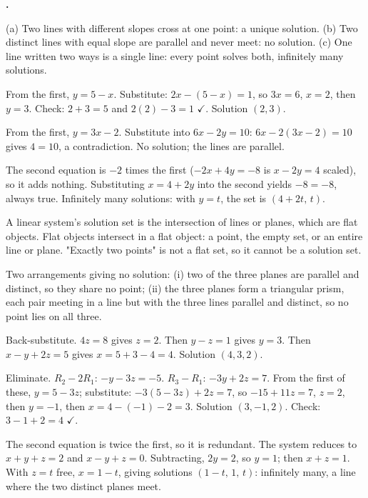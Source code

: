 \documentclass[12pt]{book}
\let\originalcheckmark\checkmark
\renewcommand{\checkmark}{\ensuremath{\originalcheckmark}}
\newcounter{soln}[section]
\newenvironment{solutions}{%
  \setcounter{soln}{0}%
  \begin{list}{\textbf{\arabic{soln}.}}{%
    \usecounter{soln}\setlength{\leftmargin}{2.2em}\setlength{\itemsep}{10pt}}%
}{\end{list}}
\begin{document}
\begin{solutions}
\item (a) Two lines with different slopes cross at one point: a unique solution. (b)
Two distinct lines with equal slope are parallel and never meet: no solution. (c) One
line written two ways is a single line: every point solves both, infinitely many
solutions.

\item From the first, $y=5-x$. Substitute: $2x-(5-x)=1$, so $3x=6$, $x=2$, then $y=3$.
Check: $2+3=5$ and $2(2)-3=1$ \checkmark. Solution $(2,3)$.

\item From the first, $y=3x-2$. Substitute into $6x-2y=10$: $6x-2(3x-2)=10$ gives
$4=10$, a contradiction. No solution; the lines are parallel.

\item The second equation is $-2$ times the first ($-2x+4y=-8$ is $x-2y=4$ scaled), so
it adds nothing. Substituting $x=4+2y$ into the second yields $-8=-8$, always true.
Infinitely many solutions: with $y=t$, the set is $(4+2t,\,t)$.

\item A linear system's solution set is the intersection of lines or planes, which are
flat objects. Flat objects intersect in a flat object: a point, the empty set, or an
entire line or plane. "Exactly two points" is not a flat set, so it cannot be a
solution set.

\item Two arrangements giving no solution: (i) two of the three planes are parallel and
distinct, so they share no point; (ii) the three planes form a triangular prism, each
pair meeting in a line but with the three lines parallel and distinct, so no point lies
on all three.

\item Back-substitute. $4z=8$ gives $z=2$. Then $y-z=1$ gives $y=3$. Then
$x-y+2z=5$ gives $x=5+3-4=4$. Solution $(4,3,2)$.

\item Eliminate. $R_2-2R_1$: $-y-3z=-5$. $R_3-R_1$: $-3y+2z=7$. From the first of
these, $y=5-3z$; substitute: $-3(5-3z)+2z=7$, so $-15+11z=7$, $z=2$, then $y=-1$, then
$x=4-(-1)-2=3$. Solution $(3,-1,2)$. Check: $3-1+2=4$ \checkmark.

\item The second equation is twice the first, so it is redundant. The system reduces to
$x+y+z=2$ and $x-y+z=0$. Subtracting, $2y=2$, so $y=1$; then $x+z=1$. With $z=t$ free,
$x=1-t$, giving solutions $(1-t,\,1,\,t)$: infinitely many, a line where the two
distinct planes meet.


\end{solutions}
\end{document}
